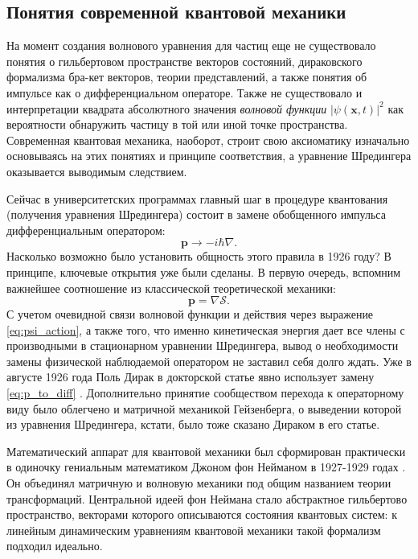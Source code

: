 \documentclass[14pt, a4paper]{extreport}
\numberwithin{equation}{section}
\begin{document}
\subsection{Понятия современной квантовой механики}

На момент создания волнового уравнения для частиц еще не существовало понятия о гильбертовом пространстве векторов состояний, дираковского формализма бра-кет векторов, теории представлений, а также понятия об импульсе как о дифференциальном операторе. Также не существовало и интерпретации квадрата абсолютного значения \textit{волновой функции} $|\psi(\mathbf{x},t)|^2$ как вероятности обнаружить частицу в той или иной точке пространства. Современная квантовая механика, наоборот, строит свою аксиоматику изначально основываясь на этих понятиях и принципе соответствия, а уравнение Шредингера оказывается выводимым следствием. 

Сейчас в университетских программах главный шаг в процедуре квантования (получения уравнения Шредингера) состоит в замене обобщенного импульса дифференциальным оператором:
\begin{equation}
	\mathbf p \rightarrow -i\hbar \nabla. \label{eq:p_to_diff}
\end{equation}
Насколько возможно было установить общность этого правила в 1926 году? В принципе, ключевые открытия уже были сделаны. В первую очередь, вспомним важнейшее соотношение из классической теоретической механики:
\begin{equation}
	\mathbf p = \nabla \mathcal S.
\end{equation}
С учетом очевидной связи волновой функции и действия через выражение \eqref{eq:psi_action}, а также того, что именно кинетическая энергия дает все члены с производными в стационарном уравнении Шредингера, вывод о необходимости замены физической наблюдаемой оператором не заставил себя долго ждать. Уже в августе 1926 года Поль Дирак в докторской статье явно использует замену \eqref{eq:p_to_diff} \cite{dirac1926theory}. Дополнительно принятие сообществом перехода к операторному виду было облегчено и матричной механикой Гейзенберга, о выведении которой из уравнения Шредингера, кстати, было тоже сказано Дираком в его статье.

Математический аппарат для квантовой механики был сформирован практически в одиночку гениальным математиком Джоном фон Нейманом в 1927-1929 годах \cite{von2018mathematical}. Он объединял матричную и волновую механики под общим названием теории трансформаций. Центральной идеей фон Неймана стало абстрактное гильбертово пространство, векторами которого описываются состояния квантовых систем: к линейным динамическим уравнениям квантовой механики такой формализм подходил идеально. 
\end{document}
